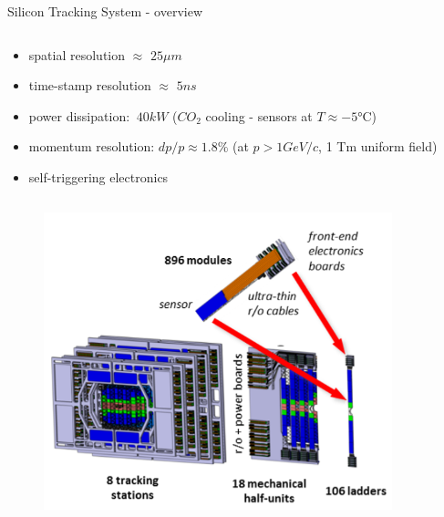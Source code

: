 \begin{columnframe}{Silicon Tracking System - overview}
    \begin{column}{0.5\textwidth}
        \begin{itemize}
            \item spatial resolution $\approx$ $25\mu m$
            \item time-stamp resolution $\approx$ $5ns$
            \item power dissipation: $~40kW$ ($CO_2$ cooling - sensors at $T\approx -5\si{\celsius}$)
            \item momentum resolution: $dp/p \approx 1.8\%$ (at $p > 1 GeV/c$, 1 Tm uniform field)
            \item self-triggering electronics
        \end{itemize}
    \end{column}
    \begin{column}{0.5\textwidth}
        \begin{figure}
            \centering
            \includegraphics[width=0.9\textwidth, frame]{images/sts_integration_model.png}
        \end{figure}
    \end{column}
\end{columnframe}
